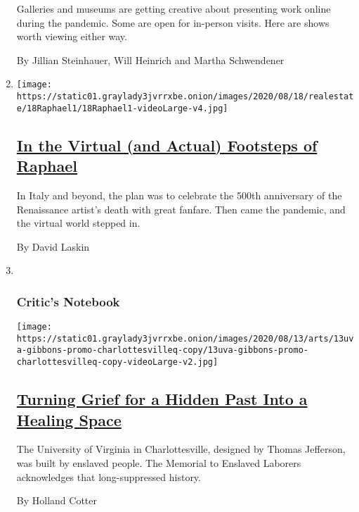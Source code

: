 \begin{enumerate}
  Galleries and museums are getting creative about presenting work
  online during the pandemic. Some are open for in-person visits. Here
  are shows worth viewing either way.

  By Jillian Steinhauer, Will Heinrich and Martha Schwendener
\item
  \texttt{[image: https://static01.graylady3jvrrxbe.onion/images/2020/08/18/realestate/18Raphael1/18Raphael1-videoLarge-v4.jpg]}

  \hypertarget{in-the-virtual-and-actual-footsteps-of-raphael}{%
  \subsection{\texorpdfstring{\href{/2020/08/18/travel/in-the-virtual-and-actual-footsteps-of-raphael.html}{In
  the Virtual (and Actual) Footsteps of
  Raphael}}{In the Virtual (and Actual) Footsteps of Raphael}}\label{in-the-virtual-and-actual-footsteps-of-raphael}}

  In Italy and beyond, the plan was to celebrate the 500th anniversary
  of the Renaissance artist's death with great fanfare. Then came the
  pandemic, and the virtual world stepped in.

  By David Laskin
\item ~
  \hypertarget{critics-notebook-1}{%
  \subsubsection{Critic's Notebook}\label{critics-notebook-1}}

  \texttt{[image: https://static01.graylady3jvrrxbe.onion/images/2020/08/13/arts/13uva-gibbons-promo-charlottesvilleq-copy/13uva-gibbons-promo-charlottesvilleq-copy-videoLarge-v2.jpg]}

  \hypertarget{turning-grief-for-a-hidden-past-into-a-healing-space}{%
  \subsection{\texorpdfstring{\href{/2020/08/16/arts/design/university-of-virginia-enslaved-laborers-memorial.html}{Turning
  Grief for a Hidden Past Into a Healing
  Space}}{Turning Grief for a Hidden Past Into a Healing Space}}\label{turning-grief-for-a-hidden-past-into-a-healing-space}}

  The University of Virginia in Charlottesville, designed by Thomas
  Jefferson, was built by enslaved people. The Memorial to Enslaved
  Laborers acknowledges that long-suppressed history.

  By Holland Cotter
\end{enumerate}

